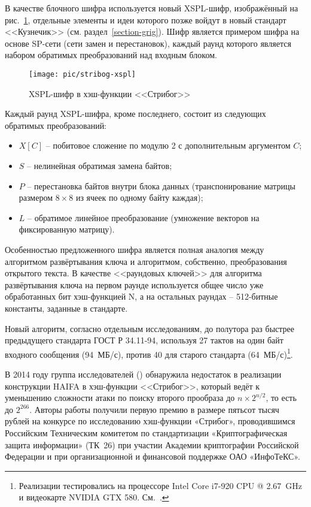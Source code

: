 В качестве блочного шифра используется новый XSPL-шифр, изображённый на рис.~\ref{fig:stribog-xspl}, отдельные элементы и идеи которого позже войдут в новый стандарт <<Кузнечик>> (см. раздел~\ref{section-grig}). Шифр является примером шифра на основе SP-сети (сети замен и перестановок), каждый раунд которого является набором обратимых преобразований над входным блоком.

\begin{figure}[htb]
	\centering
	\texttt{[image: pic/stribog-xspl]}
  \caption{XSPL-шифр в хэш-функции <<Стрибог>>}
  \label{fig:stribog-xspl}
\end{figure}

Каждый раунд XSPL-шифра, кроме последнего, состоит из следующих обратимых преобразований:
\begin{itemize}
	\item $X\left[C\right]$ -- побитовое сложение по модулю 2 с дополнительным аргументом $C$;
	\item $S$ -- нелинейная обратимая замена байтов;
	\item $P$ -- перестановка байтов внутри блока данных (транспонирование матрицы размером $8 \times 8$ из ячеек по одному байту каждая);
	\item $L$ -- обратимое линейное преобразование (умножение векторов на фиксированную матрицу).
\end{itemize}

Особенностью предложенного шифра является полная аналогия между алгоритмом развёртывания ключа и алгоритмом, собственно, преобразования открытого текста. В качестве <<раундовых ключей>> для алгоритма развёртывания ключа на первом раунде используется общее число уже обработанных бит хэш-функцией N, а на остальных раундах -- 512-битные константы, заданные в стандарте.

Новый алгоритм, согласно отдельным исследованиям, до полутора раз быстрее предыдущего стандарта ГОСТ Р 34.11-94, используя 27 тактов на один байт входного сообщения (94~МБ/с), против 40 для старого стандарта (64~МБ/с)\footnote{Реализации тестировались на процессоре Intel Core i7-920 CPU @ 2.67~GHz и видеокарте NVIDIA GTX 580. См.~\cite{Lebedev:2013}.}.

В 2014 году группа исследователей (\cite{Guo:Jean:Leurent:Peyrin:Wang:2014}) обнаружила недостаток в реализации конструкции HAIFA в хэш-функции <<Стрибог>>, который ведёт к уменьшению сложности атаки по поиску второго прообраза до $n \times 2^{n/2}$, то есть до $2^{266}$. Авторы работы получили первую премию в размере пятьсот тысяч рублей на конкурсе по исследованию хэш-функции «Стрибог», проводившимся Российским Техническим комитетом по стандартизации «Криптографическая защита информации» (ТК~26) при участии Академии криптографии Российской Федерации и при организационной и финансовой поддержке ОАО «ИнфоТеКС».

